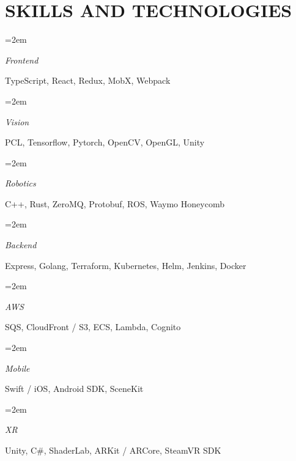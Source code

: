 \documentclass[paper=a4,fontsize=9pt]{scrartcl} %
\newlength{\spacebox}
\newcommand{\NewPart}[1]{\section*{\uppercase{#1}}}
\newcommand{\PersonalEntry}[2]{
			\noindent\hangindent=2em\hangafter=0 %
			\parbox{\spacebox}{        %
			\textit{#1}}		       %
			\hspace{1.5em} #2 \par}    %
\newcommand{\SkillsEntry}[2]{      %
			\noindent\hangindent=2em\hangafter=0 %
			\parbox{\spacebox}{        %
			\textit{#1}}			   %
			\hspace{1.5em} #2 \par}    %
\begin{document}
	\NewPart{Skills and Technologies}{}
	
	\SkillsEntry{Frontend}{TypeScript, React, Redux, MobX, Webpack}
	
	\SkillsEntry{Vision}{PCL, Tensorflow, Pytorch, OpenCV, OpenGL, Unity}
	\SkillsEntry{Robotics}{C++, Rust, ZeroMQ, Protobuf, ROS, Waymo Honeycomb}
	\SkillsEntry{Backend}{Express, Golang, Terraform, Kubernetes, Helm, Jenkins, Docker}
	\SkillsEntry{AWS}{SQS, CloudFront / S3, ECS, Lambda, Cognito}

	\SkillsEntry{Mobile}{Swift / iOS, Android SDK, SceneKit}

	\SkillsEntry{XR}{Unity, C\#, ShaderLab, ARKit / ARCore, SteamVR SDK}
	
	
\end{document}
